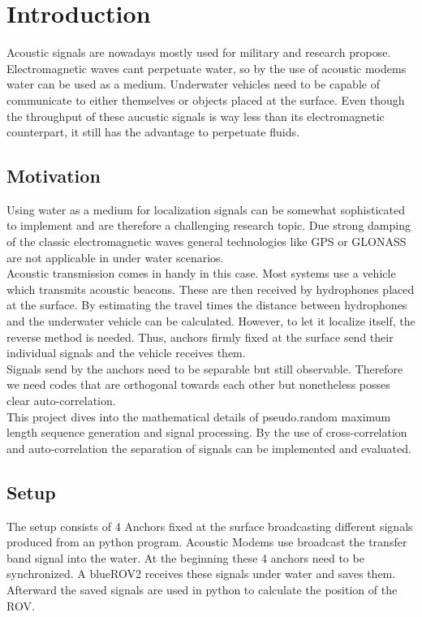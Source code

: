 \chapter{Introduction}

Acoustic signals are nowadays mostly used for military and research propose. Electromagnetic waves cant perpetuate water, so by the use of acoustic modems water can be used as a medium. Underwater vehicles need to be capable of communicate to either themselves or objects placed at the surface. Even though the throughput of these aucustic signals is way less than its electromagnetic counterpart, it still has the advantage to perpetuate fluids.\\


\section{Motivation}

Using water as a medium for localization signals can be somewhat sophisticated to implement and are therefore a challenging research topic. Due strong damping of the classic electromagnetic waves general technologies like GPS or GLONASS are not applicable in under water scenarios. \\
Acoustic transmission comes in handy in this case. Most systems use a vehicle which transmits acoustic beacons. These are then received by hydrophones placed at the surface. By estimating the travel times the distance between hydrophones and the underwater vehicle can be calculated. However, to let it localize itself, the reverse method is needed. Thus, anchors firmly fixed at the surface send their individual signals and the vehicle receives them.\\
Signals send by the anchors need to be separable but still observable. Therefore we need codes that are orthogonal towards each other but nonetheless posses clear auto-correlation. \\
This project dives into the mathematical details of pseudo.random maximum length sequence generation and signal processing. By the use of cross-correlation and auto-correlation the separation of signals can be implemented and evaluated. 

\section{Setup}

The setup consists of 4 Anchors fixed at the surface broadcasting different signals produced from an python program. Acoustic Modems use broadcast the transfer band signal into the water. At the beginning these 4 anchors need to be synchronized. A blueROV2 receives these signals under water and saves them. Afterward the saved signals are used in python to calculate the position of the ROV.

